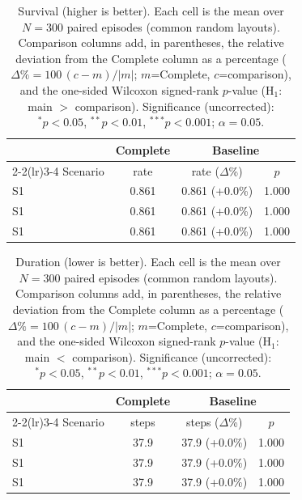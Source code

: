 \begin{table}[ht]
  \centering
  \caption{Survival (higher is better). Each cell is the mean over $N=300$ paired episodes (common random layouts). Comparison columns add, in parentheses, the relative deviation from the Complete column as a percentage ($\Delta\%=100\,(c-m)/|m|$; $m$=Complete, $c$=comparison), and the one-sided Wilcoxon signed-rank $p$-value (H$_1$: main $>$ comparison). Significance (uncorrected): $^{*}p<0.05$, $^{**}p<0.01$, $^{***}p<0.001$; $\alpha=0.05$.}
  \label{tab:wilcoxon-survival}
  \small
  \begin{tabular}{l c cc}
    \toprule
     & Complete & \multicolumn{2}{c}{Baseline} \\
    \cmidrule(lr){2-2}\cmidrule(lr){3-4}
    Scenario & {rate} & {rate ($\Delta$\%)} & {$p$} \\
    \midrule
    S1 & 0.861 & 0.861 (+0.0\%) & 1.000 \\
    S1 & 0.861 & 0.861 (+0.0\%) & 1.000 \\
    S1 & 0.861 & 0.861 (+0.0\%) & 1.000 \\
    \bottomrule
  \end{tabular}
\end{table}

\begin{table}[ht]
  \centering
  \caption{Duration (lower is better). Each cell is the mean over $N=300$ paired episodes (common random layouts). Comparison columns add, in parentheses, the relative deviation from the Complete column as a percentage ($\Delta\%=100\,(c-m)/|m|$; $m$=Complete, $c$=comparison), and the one-sided Wilcoxon signed-rank $p$-value (H$_1$: main $<$ comparison). Significance (uncorrected): $^{*}p<0.05$, $^{**}p<0.01$, $^{***}p<0.001$; $\alpha=0.05$.}
  \label{tab:wilcoxon-duration}
  \small
  \begin{tabular}{l c cc}
    \toprule
     & Complete & \multicolumn{2}{c}{Baseline} \\
    \cmidrule(lr){2-2}\cmidrule(lr){3-4}
    Scenario & {steps} & {steps ($\Delta$\%)} & {$p$} \\
    \midrule
    S1 & 37.9 & 37.9 (+0.0\%) & 1.000 \\
    S1 & 37.9 & 37.9 (+0.0\%) & 1.000 \\
    S1 & 37.9 & 37.9 (+0.0\%) & 1.000 \\
    \bottomrule
  \end{tabular}
\end{table}

